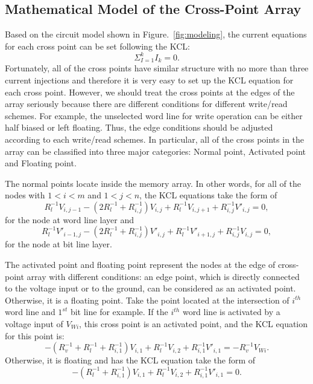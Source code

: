 \subsection{Mathematical Model of the Cross-Point Array}
Based on the circuit model shown in Figure.~\ref{fig:modeling}, the current equations for each cross point can be set following the KCL:
\begin{equation}
  {\Sigma}_{I=1}^kI_k=0.
\end{equation}
Fortunately, all of the cross points have similar structure with no more than three current injections and therefore it is very easy to set up the KCL equation for each cross point. However, we should treat the cross points at the edges of the array seriously because there are different conditions for different write/read schemes. For example, the unselected word line for write operation can be either half biased or left floating. Thus, the edge conditions should be adjusted according to each write/read schemes. In particular, all of the cross points in the array can be classified into three major categories: Normal point, Activated point and Floating point.

The normal points locate inside the memory array. In other words, for all of the nodes with $1<i<m$ and $1<j<n$, the KCL equations take the form of
\begin{equation}\label{equ:KCL1}
R_l^{-1}V_{i,j-1} -(2R_l^{-1}+R_{i,j}^{-1})V_{i,j}+ R_l^{-1}V_{i,j+1}+R_{i,j}^{-1}V'_{i,j}=0,
\end{equation}
for the node at word line layer and
\begin{equation}\label{equ:KCL2}
R_l^{-1}V'_{i-1,j} -(2R_l^{-1}+R_{i,j}^{-1})V'_{i,j}+ R_l^{-1}V'_{i+1,j}+R_{i,j}^{-1}V_{i,j}=0,
\end{equation}
for the node at bit line layer.

The activated point and floating point represent the nodes at the edge of cross-point array with different conditions: an edge point, which is directly connected to the voltage input or to the ground, can be considered as an activated point. Otherwise, it is a floating point. Take the point located at the intersection of $i^{th}$ word line and $1^{st}$ bit line for example. If the $i^{th}$ word line is activated by a voltage input of $V_{Wi}$, this cross point is an activated point, and the KCL equation for this point is:
\begin{equation}\label{equ:KCL3}
-(R_v^{-1}+R_l^{-1}+R_{i,1}^{-1})V_{i,1}+ R_l^{-1}V_{i,2}+R_{i,1}^{-1}V'_{i,1}=-R_v^{-1}V_{Wi}.
\end{equation}
Otherwise, it is floating and has the KCL equation take the form of
\begin{equation}\label{equ:KCL4}
-(R_l^{-1}+R_{i,1}^{-1})V_{i,1}+ R_l^{-1}V_{i,2}+R_{i,1}^{-1}V'_{i,1}=0.
\end{equation}

